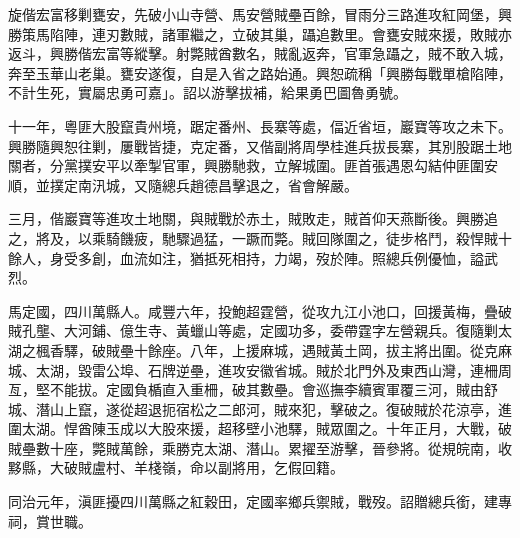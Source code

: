 \begin{pinyinscope}
旋偕宏富移剿甕安，先破小山寺營、馬安營賊壘百餘，冒雨分三路進攻紅岡堡，興勝策馬陷陣，連刃數賊，諸軍繼之，立破其巢，躡追數里。會甕安賊來援，敗賊亦返斗，興勝偕宏富等縱擊。射斃賊酋數名，賊亂返奔，官軍急躡之，賊不敢入城，奔至玉華山老巢。甕安遂復，自是入省之路始通。興恕疏稱「興勝每戰單槍陷陣，不計生死，實屬忠勇可嘉」。詔以游擊拔補，給果勇巴圖魯勇號。

十一年，粵匪大股竄貴州境，踞定番州、長寨等處，偪近省垣，巖寶等攻之未下。興勝隨興恕往剿，屢戰皆捷，克定番，又偕副將周學桂進兵拔長寨，其別股踞土地關者，分黨撲安平以牽掣官軍，興勝馳救，立解城圍。匪首張遇恩勾結仲匪圍安順，並撲定南汛城，又隨總兵趙德昌擊退之，省會解嚴。

三月，偕巖寶等進攻土地關，與賊戰於赤土，賊敗走，賊首仰天燕斷後。興勝追之，將及，以乘騎饑疲，馳驟過猛，一蹶而斃。賊回隊圍之，徒步格鬥，殺悍賊十餘人，身受多創，血流如注，猶抵死相持，力竭，歿於陣。照總兵例優恤，謚武烈。

馬定國，四川萬縣人。咸豐六年，投鮑超霆營，從攻九江小池口，回援黃梅，疊破賊孔壟、大河鋪、億生寺、黃蠟山等處，定國功多，委帶霆字左營親兵。復隨剿太湖之楓香驛，破賊壘十餘座。八年，上援麻城，遇賊黃土岡，拔主將出圍。從克麻城、太湖，毀雷公埠、石牌逆壘，進攻安徽省城。賊於北門外及東西山灣，連柵周亙，堅不能拔。定國負楯直入重柵，破其數壘。會巡撫李續賓軍覆三河，賊由舒城、潛山上竄，遂從超退扼宿松之二郎河，賊來犯，擊破之。復破賊於花涼亭，進圍太湖。悍酋陳玉成以大股來援，超移壁小池驛，賊眾圍之。十年正月，大戰，破賊壘數十座，斃賊萬餘，乘勝克太湖、潛山。累擢至游擊，晉參將。從規皖南，收黟縣，大破賊盧村、羊棧嶺，命以副將用，乞假回籍。

同治元年，滇匪擾四川萬縣之紅穀田，定國率鄉兵禦賊，戰歿。詔贈總兵銜，建專祠，賞世職。


\end{pinyinscope}